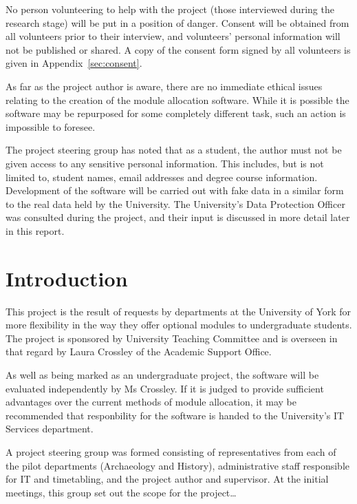 \documentclass[]{scrartcl}
\begin{document}
No person volunteering to help with the project (those interviewed during the research stage) will be put in a position of danger. Consent will be obtained from all volunteers prior to their interview, and volunteers' personal information will not be published or shared. A copy of the consent form signed by all volunteers is given in Appendix~\ref{sec:consent}.

As far as the project author is aware, there are no immediate ethical issues relating to the creation of the module allocation software. While it is possible the software may be repurposed for some completely different task, such an action is impossible to foresee.

The project steering group has noted that as a student, the author must not be given access to any sensitive personal information. This includes, but is not limited to, student names, email addresses and degree course information. Development of the software will be carried out with fake data in a similar form to the real data held by the University. The University's Data Protection Officer was consulted during the project, and their input is discussed in more detail later in this report.

\section{Introduction}


This project is the result of requests by departments at the University of York for more flexibility in the way they offer optional modules to undergraduate students. The project is sponsored by University Teaching Committee and is overseen in that regard by Laura Crossley of the Academic Support Office.

As well as being marked as an undergraduate project, the software will be evaluated independently by Ms Crossley. If it is judged to provide sufficient advantages over the current methods of module allocation, it may be recommended that responbility for the software is handed to the University's IT Services department.

A project steering group was formed consisting of representatives from each of the pilot departments (Archaeology and History), administrative staff responsible for IT and timetabling, and the project author and supervisor. At the initial meetings, this group set out the scope for the project…
\end{document}

